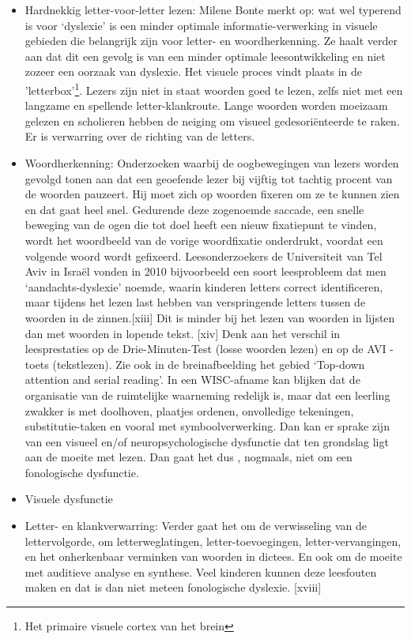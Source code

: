 \begin{itemize}

	\item Hardnekkig letter-voor-letter lezen: Milene Bonte merkt op: wat wel typerend is voor ‘dyslexie’ is een minder optimale informatie-verwerking in visuele gebieden die belangrijk zijn voor letter- en woordherkenning. Ze haalt verder aan dat dit een gevolg is van een minder optimale leesontwikkeling en niet zozeer een oorzaak van dyslexie. Het visuele proces vindt plaats in de 'letterbox'\footnote{Het primaire visuele cortex van het brein}. Lezers zijn niet in staat woorden goed te lezen, zelfs niet met een langzame en spellende letter-klankroute. Lange woorden worden moeizaam gelezen en scholieren hebben de neiging om visueel gedesoriënteerde te raken. Er is verwarring over de richting van de letters.
	
	\item Woordherkenning: Onderzoeken waarbij de oogbewegingen van lezers worden gevolgd tonen aan dat een geoefende lezer bij vijftig tot tachtig procent van de woorden pauzeert. Hij moet zich op woorden fixeren om ze te kunnen zien en dat gaat heel snel. Gedurende deze zogenoemde saccade, een snelle beweging van de ogen die tot doel heeft een nieuw fixatiepunt te vinden, wordt het woordbeeld van de vorige woordfixatie onderdrukt, voordat een volgende woord wordt gefixeerd. Leesonderzoekers de Universiteit van Tel Aviv in Israël vonden in 2010 bijvoorbeeld een soort leesprobleem dat men ‘aandachts-dyslexie’ noemde, waarin kinderen letters correct identificeren, maar tijdens het lezen last hebben van verspringende letters tussen de woorden in de zinnen.[xiii] Dit is minder bij het lezen van woorden in lijsten dan met woorden in lopende tekst. [xiv] Denk aan het verschil in leesprestaties op de Drie-Minuten-Test (losse woorden lezen) en op de AVI -toets (tekstlezen). Zie ook in de breinafbeelding het gebied ‘Top-down attention and serial reading’. In een WISC-afname kan blijken dat de organisatie van de ruimtelijke waarneming redelijk is, maar dat een leerling zwakker is met doolhoven, plaatjes ordenen, onvolledige tekeningen, substitutie-taken en vooral met symboolverwerking. Dan kan er sprake zijn van een visueel en/of neuropsychologische dysfunctie dat ten grondslag ligt aan de moeite met lezen. Dan gaat het dus , nogmaals, niet om een fonologische dysfunctie.
	
	\item Visuele dysfunctie
	
	\item Letter- en klankverwarring: Verder gaat het om de verwisseling van de lettervolgorde, om letterweglatingen, letter-toevoegingen, letter-vervangingen, en het onherkenbaar verminken van woorden in dictees. En ook om de moeite met auditieve analyse en synthese. Veel kinderen kunnen deze leesfouten maken en dat is dan niet meteen fonologische dyslexie. [xviii]
\end{itemize}


